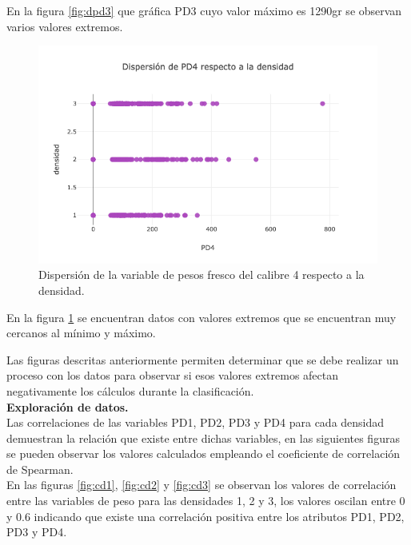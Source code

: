 En la figura \ref{fig:dpd3} que gráfica PD3 cuyo valor máximo es 1290gr se observan varios valores extremos.

\begin{figure}[h!]
	\centering
	\includegraphics[scale=0.5]{d-pd4.png}
	\caption{Dispersión de la variable de pesos fresco del calibre 4 respecto a la densidad.}
	\label{fig:dpd4}
\end{figure}

En la figura \ref{fig:dpd4} se encuentran datos con valores extremos que se encuentran muy cercanos al mínimo y máximo.

Las figuras descritas anteriormente permiten determinar que se debe realizar un proceso con los datos para observar si esos valores extremos afectan negativamente los cálculos durante la clasificación.\\


\noindent
\textbf{Exploración de datos.}\\

Las correlaciones de las variables PD1, PD2, PD3 y PD4 para cada densidad demuestran la relación que existe entre dichas variables, en las siguientes figuras se pueden observar los valores calculados empleando el coeficiente de correlación de Spearman.\\

En las figuras \ref{fig:cd1}, \ref{fig:cd2} y \ref{fig:cd3} se observan los valores de correlación entre las variables de peso para las densidades 1, 2 y 3, los valores oscilan entre 0 y 0.6 indicando que existe una correlación positiva entre los atributos PD1, PD2, PD3 y PD4.\\

